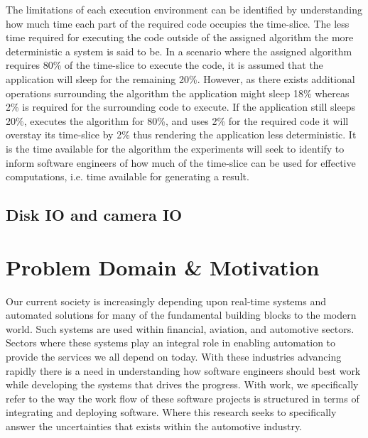 The limitations of each execution environment can be identified by understanding how much time each part of the required code occupies the time-slice. The less time required for executing the code outside of the assigned algorithm the more deterministic a system is said to be. In a scenario where the assigned algorithm requires 80\% of the time-slice to execute the code, it is assumed that the application will sleep for the remaining 20\%. However, as there exists additional operations surrounding the algorithm the application might sleep 18\% whereas 2\% is required for the surrounding code to execute. If the application still sleeps 20\%, executes the algorithm for 80\%, and uses 2\% for the required code it will overstay its time-slice by 2\% thus rendering the application less deterministic. It is the time available for the algorithm the experiments will seek to identify to inform software engineers of how much of the time-slice can be used for effective computations, i.e. time available for generating a result.\\



\subsection{Disk IO and camera IO}



\section{Problem Domain \& Motivation}
Our current society is increasingly depending upon real-time systems and automated solutions for many of the fundamental building blocks to the modern world. Such systems are used within financial, aviation, and automotive sectors. Sectors where these systems play an integral role in enabling automation to provide the services we all depend on today. With these industries advancing rapidly there is a need in understanding how software engineers should best work while developing the systems that drives the progress. With work, we specifically refer to the way the work flow of these software projects is structured in terms of integrating and deploying software. Where this research seeks to specifically answer the uncertainties that exists within the automotive industry. \\

